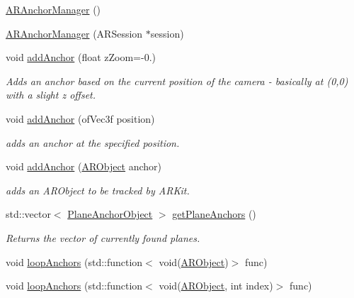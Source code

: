 \begin{DoxyCompactItemize}
\item 
\hyperlink{class_a_r_core_1_1_a_r_anchor_manager_ad4f5727e58d9b4c6f582c50ba5ac0f49}{A\+R\+Anchor\+Manager} ()
\item 
\hyperlink{class_a_r_core_1_1_a_r_anchor_manager_a471dcdacaedea4647a04c34052742a61}{A\+R\+Anchor\+Manager} (A\+R\+Session $\ast$session)
\item 
void \hyperlink{class_a_r_core_1_1_a_r_anchor_manager_a462546bf84296188fd899d533a3c17bd}{add\+Anchor} (float z\+Zoom=-\/0.)
\begin{DoxyCompactList}\small\item\em Adds an anchor based on the current position of the camera -\/ basically at (0,0) with a slight z offset. \end{DoxyCompactList}\item 
void \hyperlink{class_a_r_core_1_1_a_r_anchor_manager_a60602a79fbc9bf27e5f88bc0b3984ac4}{add\+Anchor} (of\+Vec3f position)
\begin{DoxyCompactList}\small\item\em adds an anchor at the specified position. \end{DoxyCompactList}\item 
void \hyperlink{class_a_r_core_1_1_a_r_anchor_manager_ae710a985f06cfe488f218f49e8d0329a}{add\+Anchor} (\hyperlink{struct_a_r_objects_1_1_a_r_object}{A\+R\+Object} anchor)
\begin{DoxyCompactList}\small\item\em adds an A\+R\+Object to be tracked by A\+R\+Kit. \end{DoxyCompactList}\item 
std\+::vector$<$ \hyperlink{struct_a_r_objects_1_1_plane_anchor_object}{Plane\+Anchor\+Object} $>$ \hyperlink{class_a_r_core_1_1_a_r_anchor_manager_a46a02253729234aef5617512f48e9211}{get\+Plane\+Anchors} ()
\begin{DoxyCompactList}\small\item\em Returns the vector of currently found planes. \end{DoxyCompactList}\item 
void \hyperlink{class_a_r_core_1_1_a_r_anchor_manager_a687246a5f0aacaac63053c0e05081e11}{loop\+Anchors} (std\+::function$<$ void(\hyperlink{struct_a_r_objects_1_1_a_r_object}{A\+R\+Object})$>$ func)
\item 
void \hyperlink{class_a_r_core_1_1_a_r_anchor_manager_a03ee4092b5d958f8b1467e0a0e62f9b9}{loop\+Anchors} (std\+::function$<$ void(\hyperlink{struct_a_r_objects_1_1_a_r_object}{A\+R\+Object}, int index)$>$ func)

\end{DoxyCompactItemize}
